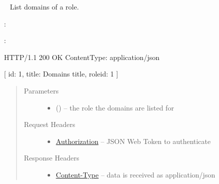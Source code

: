 \documentclass[letterpaper,10pt,english]{sphinxmanual}
\begin{document}
\begin{fulllineitems}
\label{\detokenize{resources/role:get--roles-(role_id)-domains}}~
List domains of a role.

:

\begin{sphinxVerbatim}[commandchars=\\\{\}]
  
 
 
\end{sphinxVerbatim}

:

\begin{sphinxVerbatim}[commandchars=\\\{\}]
HTTP/1.1 200 OK
Content\PYGZhy{}Type: application/json

[
    \PYGZob{}
        \PYGZsq{}id\PYGZsq{}: 1,
        \PYGZsq{}title\PYGZsq{}: \PYGZsq{}Domain\PYGZsq{}s title\PYGZsq{},
        \PYGZsq{}role\PYGZus{}id\PYGZsq{}: 1
    \PYGZcb{}
]
\end{sphinxVerbatim}
\begin{quote}\begin{description}
\item[{Parameters}] \leavevmode\begin{itemize}
\item {} 
 () -- the role the domains are listed for

\end{itemize}

\item[{Request Headers}] \leavevmode\begin{itemize}
\item {} 
\href{http://tools.ietf.org/html/rfc7235\#section-4.2}{Authorization} -- JSON Web Token to authenticate

\end{itemize}

\item[{Response Headers}] \leavevmode\begin{itemize}
\item {} 
\href{http://tools.ietf.org/html/rfc7231\#section-3.1.1.5}{Content-Type} -- data is received as application/json


\end{itemize}
\end{description}
\end{quote}
\end{fulllineitems}
\end{document}
